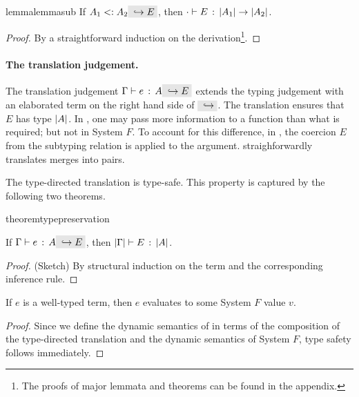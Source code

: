 

\begin{restatable}{lemma}{lemmasub}
  \label{lemma:sub}
  If $ A_1 \subtype A_2 \yields E $, then $ \cdot \vdash E \ \!:\! \ \lvert A_1 \rvert \to \lvert A_2 \rvert $.
\end{restatable}

\begin{proof}
  By a straightforward induction on the derivation\footnote{The proofs of major lemmata and theorems can be found in the appendix.}.
\end{proof}

\paragraph{The translation judgement.} The translation judgement $\jtype \Gamma e
A \yields E$ extends the typing judgement with an elaborated term on the right
hand side of $\yields {}$. The translation ensures that $E$ has type $\lvert A \rvert$. In
\name, one may pass more information to a function than what is required; but
not in System $F$. To account for this difference, in , the
coercion $E$ from the subtyping relation is applied to the argument.
 straighforwardly translates merges into pairs.

The type-directed translation is type-safe. This property is captured
by the following two theorems.

\begin{restatable}{theorem}{typepreservation}
  \label{theorem:type-preservation}

  If $ \jtype \Gamma e A \yields E $,
  then $ \lvert \Gamma \rvert \vdash E \ \!:\! \ \lvert A \rvert $.
\end{restatable}

\begin{proof}
  (Sketch) By structural induction on the term and the corresponding
  inference rule.
\end{proof}

\begin{theorem}
  If $e$ is a well-typed \name term, then $e$ evaluates to some System $F$
  value $v$.
\end{theorem}

\begin{proof}
  Since we define the dynamic semantics of \name in terms of the composition of
  the type-directed translation and the dynamic semantics of System $F$, type safety follows immediately.
\end{proof}
